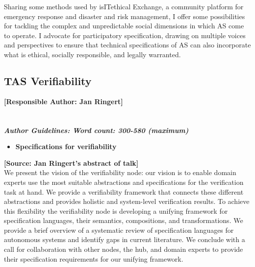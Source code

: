 \documentclass[sigconf]{acmart}
\begin{document}
Sharing some methods used by isITethical Exchange, a community platform for emergency response and disaster and risk management, I offer some possibilities for tackling the complex and unpredictable social dimensions in which AS come to operate. I advocate for participatory specification, drawing on multiple voices and perspectives to ensure that technical specifications of AS can also incorporate what is ethical, socially responsible, and legally warranted.

\subsection{TAS Verifiability}
\noindent\textbf{[Responsible Author:  Jan Ringert]}\\
\\\\
\noindent\textbf{\textit{Author Guidelines: Word count: 300-580 (maximum)}}\\
\begin{itemize}
	\item \textbf{Specifications for verifiability}
\end{itemize}
%
%
%

\noindent\textbf{[Source: Jan Ringert's abstract of talk] }
\\We present the vision of the verifiability node: our vision is to enable domain experts use the most suitable abstractions and specifications for the verification task at hand. We provide a verifiability framework that connects these different abstractions and provides holistic and system-level verification results.  To achieve this flexibility the verifiability node is developing a unifying framework for specification languages, their semantics, compositions, and transformations. We provide a brief overview of a systematic review of specification languages for autonomous systems and identify gaps in current literature. We conclude with a call for collaboration with other nodes, the hub, and domain experts to provide their specification requirements for our unifying framework.
\end{document}
